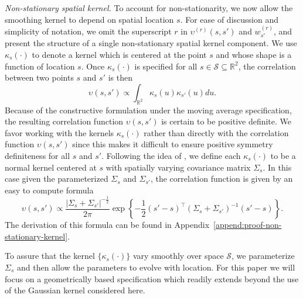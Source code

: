\documentclass[journal]{IEEEtran}
\begin{document}
\vspace{.1in}
\noindent\emph{Non-stationary spatial kernel.}
To account for non-stationarity, we now allow the smoothing kernel to depend on spatial location $s$. 
For ease of discussion and simplicity of notation, we omit the superscript $r$ in $\upsilon^{(r)}(s, s')$ and $w^{(r)}_{s'}$, and present the structure of a single non-stationary spatial kernel component. 
We use $\kappa_s(\cdot)$ to denote a kernel which is centered at the point $s$ and whose shape is a function of location $s$. Once $\kappa_s(\cdot)$ is specified for all $s \in \mathscr{S} \subseteq \mathbb{R}^2$, the correlation between two points $s$ and $s'$ is then 
\begin{equation}
    \upsilon(s, s') \propto \int_{\mathbb{R}^2} \kappa_s(u) \kappa_{s'}(u) du. 
    \label{eq:def-non-stationary-kernel}
\end{equation}
Because of the constructive formulation under the moving average specification, the resulting correlation function $\upsilon(s, s')$ is certain to be positive definite.
We favor working with the kernels $\kappa_s(\cdot)$ rather than directly with the correlation function $\upsilon(s, s')$ since this makes it difficult to ensure positive symmetry definiteness for all $s$ and $s'$.
Following the idea of \cite{bernardo1998non, zhu2021imitation}, we define each $\kappa_s(\cdot)$ to be a normal kernel centered at $s$ with spatially varying covariance matrix $\Sigma_s$. In this case given the parameterized $\Sigma_s$ and $\Sigma_{s'}$,
the correlation function is given by an easy to compute formula
\[
\upsilon(s, s') \!\propto\! \frac{| \Sigma_s + \Sigma_{s'} |^{-\frac{1}{2}}}{2\pi} \exp\left \{-\frac{1}{2}(s' - s)^\top(\Sigma_s + \Sigma_{s'})^{-1}(s' - s)\right \}.
\]
The derivation of this formula can be found in Appendix~\ref{append:proof-non-stationary-kernel}.

To assure that the kernel $\{\kappa_s(\cdot)\}$ vary smoothly over space $\mathscr{S}$, we parameterize $\Sigma_s$ and then allow the parameters to evolve with location. 
For this paper we will focus on a geometrically based specification which readily extends beyond the use of the Gaussian kernel considered here.
\end{document}
